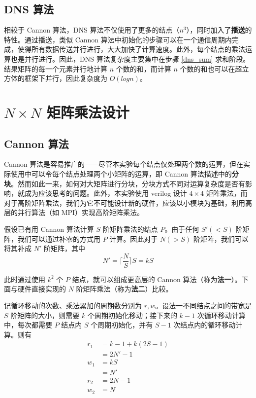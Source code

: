 \documentclass{zjureport-zh}
\begin{document}
\subsection{DNS 算法}
\par 相较于 Cannon 算法，DNS 算法不仅使用了更多的结点（$n^3$），同时加入了\textbf{播送}的特性。通过播送，类似 Cannon 算法中初始化的步骤可以在一个通信周期内完成，使得所有数据传送并行进行，大大加快了计算速度。此外，每个结点的乘法运算也是并行进行。因此，DNS 算法复杂度主要集中在步骤 \ref{dns_sum} 求和阶段。结果矩阵的每一个元素并行地计算 $n$ 个数的和，而计算 $n$ 个数的和也可以在超立方体的框架下并行，因此复杂度为 $O(logn)$。

\section{$N \times N$ 矩阵乘法设计}
\subsection{Cannon 算法}
\par Cannon 算法是容易推广的——尽管本实验每个结点仅处理两个数的运算，但在实际使用中可以令每个结点处理两个小矩阵的运算，即 Cannon 算法描述中的\textbf{分块}。然而如此一来，如何对大矩阵进行分块，分块方式不同对运算复杂度是否有影响，就成为应该思考的问题。此外，本实验使用 verilog 设计 $4 \times 4$ 矩阵乘法，而对于高阶矩阵乘法，我们为它不可能设计新的硬件，应该以小模块为基础，利用高层的并行算法（如 MPI）实现高阶矩阵乘法。
\par 假设已有用 Cannon 算法计算 $S$ 阶矩阵乘法的结点 $P$。由于任何 $S'(<S)$ 阶矩阵，我们可以通过补零的方式用 $P$ 计算。因此对于 $N(>S)$ 阶矩阵，我们可以将其补成 $N'$ 阶矩阵，其中
$$
	N' = \lceil\frac{N}{S}\rceil S = kS
$$
\par 此时通过使用 $k^2$ 个 $P$ 结点，就可以组成更高层的 Cannon 算法（称为\textbf{法一}）。下面与硬件直接实现的 $N$ 阶矩阵乘法（称为\textbf{法二}）比较。
\par 记循环移动的次数、乘法累加的周期数分别为 $r, w$。设法一不同结点之间的带宽是 $S$ 阶矩阵的大小，则需要 $k$ 个周期初始化移动；接下来的 $k-1$ 次循环移动计算中，每次都需要 $P$ 结点内 $S$ 个周期初始化，并有 $S-1$ 次结点内的循环移动计算。则有
\begin{align*}
	r_1 &= k-1 + k(2S - 1) \\
		&= 2N' - 1 \\
	w_1 &= kS \\
		&= N' \\
	r_2 &= 2N-1 \\
	w_2 &= N
\end{align*}
\end{document}
